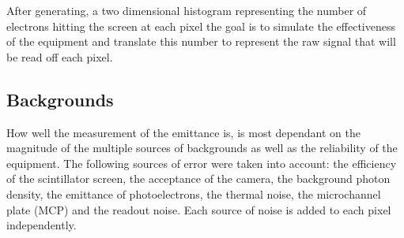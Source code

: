 



After generating, a two dimensional histogram representing the number of
electrons hitting the screen at each pixel the goal is to simulate the
effectiveness of the equipment and translate this number to represent the raw
signal that will be read off each pixel.

\subsection{Backgrounds}

How well the measurement of the emittance is, is most dependant on the
magnitude of the multiple sources of backgrounds as well as the reliability of
the equipment. The following sources of error were taken into account: the
efficiency of the scintillator screen, the acceptance of the camera, the
background photon density, the emittance of photoelectrons, the thermal noise,
the microchannel plate (MCP) and the readout noise. Each source of noise is added
to each pixel independently.


